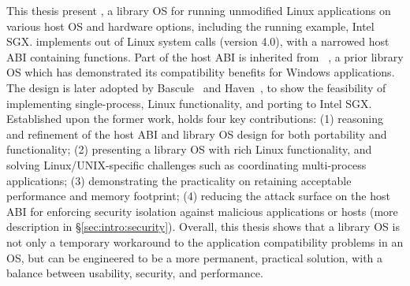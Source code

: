 

This thesis present \graphene{}, a library OS for running unmodified Linux applications on various host OS and hardware options, including the running example, Intel SGX.
\graphene{} implements \graphenesyscalls{} out of \linuxsyscalls{} Linux system calls (version 4.0), with a narrowed host ABI containing \palcalls{} functions.
Part of the host ABI is inherited from \drawbridge{}~\cite{porter11drawbridge}, a prior library OS which has demonstrated its compatibility benefits for Windows applications.
The \drawbridge{} design is later adopted by Bascule~\cite{baumann13bascule} and Haven~\cite{baumann14haven}, to show the feasibility of implementing single-process, Linux functionality, and porting to Intel SGX.
Established upon the former work, \graphene{} holds four key contributions:
(1) reasoning and refinement of the host ABI and library OS design for both portability and functionality;
(2) presenting a library OS with rich Linux functionality, and solving Linux/UNIX-specific challenges such as coordinating multi-process applications;
(3) demonstrating the practicality on retaining acceptable performance and memory footprint;
(4) reducing the attack surface on the host ABI for enforcing security isolation against malicious applications or hosts (more description in \S\ref{sec:intro:security}).
Overall, this thesis shows that a library OS is not only a temporary workaround to the application compatibility problems in an OS,
but can be engineered to be a more permanent, practical solution, with a balance between usability, security, and performance. 




